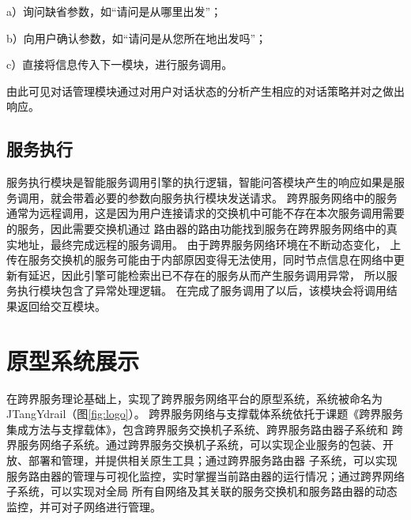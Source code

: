a）询问缺省参数，如“请问是从哪里出发”；

b）向用户确认参数，如“请问是从您所在地出发吗”；

c）直接将信息传入下一模块，进行服务调用。

由此可见对话管理模块通过对用户对话状态的分析产生相应的对话策略并对之做出响应。

\subsection{服务执行}
服务执行模块是智能服务调用引擎的执行逻辑，智能问答模块产生的响应如果是服务调用，就会带着必要的参数向服务执行模块发送请求。
跨界服务网络中的服务通常为远程调用，这是因为用户连接请求的交换机中可能不存在本次服务调用需要的服务，因此需要交换机通过
路由器的路由功能找到服务在跨界服务网络中的真实地址，最终完成远程的服务调用。
由于跨界服务网络环境在不断动态变化，
上传在服务交换机的服务可能由于内部原因变得无法使用，同时节点信息在网络中更新有延迟，因此引擎可能检索出已不存在的服务从而产生服务调用异常，
所以服务执行模块包含了异常处理逻辑。
在完成了服务调用了以后，该模块会将调用结果返回给交互模块。


\section{原型系统展示}
在跨界服务理论基础上，实现了跨界服务网络平台的原型系统，系统被命名为JTangYdrail（图\ref{fig:logo}）。
跨界服务网络与支撑载体系统依托于课题《跨界服务集成方法与支撑载体》，包含跨界服务交换机子系统、跨界服务路由器子系统和
跨界服务网络子系统。通过跨界服务交换机子系统，可以实现企业服务的包装、开放、部署和管理，并提供相关原生工具；通过跨界服务路由器
子系统，可以实现服务路由器的管理与可视化监控，实时掌握当前路由器的运行情况；通过跨界网络子系统，可以实现对全局
所有自网络及其关联的服务交换机和服务路由器的动态监控，并可对子网络进行管理。

